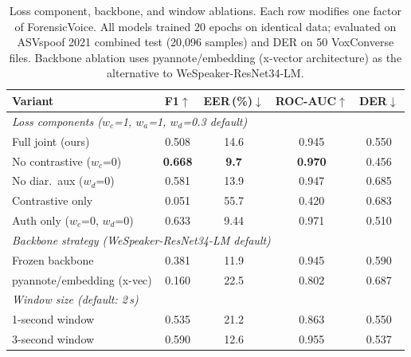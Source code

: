 \documentclass{article}
\newcommand{\fv}{ForensicVoice}
\begin{document}
\begin{table}[t]
  \caption{
    Loss component, backbone, and window ablations. Each row modifies one
    factor of \fv{}. All models trained 20 epochs on identical data;
    evaluated on ASVspoof 2021 combined test (20{,}096 samples) and
    DER on 50 VoxConverse files. Backbone ablation uses pyannote/embedding
    (x-vector architecture) as the alternative to WeSpeaker-ResNet34-LM.
  }
  \label{tab:ablation}
  \centering
  \small
  \begin{tabular}{lcccc}
    \toprule
    \textbf{Variant} & \textbf{F1}$\uparrow$ & \textbf{EER\,(\%)}$\downarrow$
      & \textbf{ROC-AUC}$\uparrow$ & \textbf{DER}$\downarrow$ \\
    \midrule
    \multicolumn{5}{l}{\textit{Loss components ($w_c$=1, $w_a$=1, $w_d$=0.3 default)}} \\
    Full joint (ours)          & 0.508 & 14.6 & 0.945 & 0.550 \\
    No contrastive ($w_c$=0)   & \textbf{0.668} & \textbf{9.7}  & \textbf{0.970} & 0.456 \\
    No diar.\ aux ($w_d$=0)    & 0.581 & 13.9 & 0.947 & 0.685 \\
    Contrastive only           & 0.051 & 55.7 & 0.420 & 0.683 \\
    Auth only ($w_c$=0, $w_d$=0) & 0.633 & 9.44 & 0.971 & 0.510 \\
    \midrule
    \multicolumn{5}{l}{\textit{Backbone strategy (WeSpeaker-ResNet34-LM default)}} \\
    Frozen backbone            & 0.381 & 11.9 & 0.945 & 0.590 \\
    pyannote/embedding (x-vec) & 0.160 & 22.5 & 0.802 & 0.687 \\
    \midrule
    \multicolumn{5}{l}{\textit{Window size (default: 2\,s)}} \\
    1-second window            & 0.535 & 21.2 & 0.863 & 0.550 \\
    3-second window            & 0.590 & 12.6 & 0.955 & 0.537 \\
    \bottomrule
  \end{tabular}
\end{table}
\end{document}
